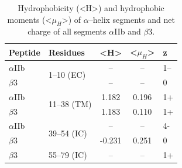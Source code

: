\documentclass[journal=jacsat,manuscript=article]{achemso}
\begin{document}
\begin{table}
\centering
\caption{Hydrophobicity (<H>) and hydrophobic moments (<$\mu_H$>) of $\alpha$–helix segments and net charge of all segments $\alpha$IIb and $\beta$3.}\label{tab:percent_hidrofo}
\begin{tabular}{@{}llccl@{}}
\toprule
Peptide     & Residues             & <H>       & <$\mu_H$> 	& z  \\ \midrule
$\alpha$IIb & \multirow{2}{*}{1–10 \; (EC)}      & –  	     & – 		    & 1– \\
$\beta$3    &                                    & –  	     & –            & 0  \vspace{3mm} \\

$\alpha$IIb & \multirow{2}{*}{11–38 \;(TM)}     & 1.182  	& 0.196 		& 1+ \\
$\beta$3    &                                   & 1.183  	& 0.110 		& 1+ \vspace{3mm} \\

$\alpha$IIb & \multirow{2}{*}{39–54 \;(IC)}     & – 	    & –		          & 4- \\
$\beta$3    &                                   & -0.231 	& 0.251 		    & 0  \vspace{3mm} \\

$\beta$3    & 55–79 \;(IC)                      & –  	& – 		& 1+ \\ \bottomrule
\end{tabular}
\end{table}
\end{document}
